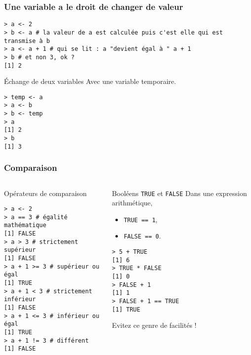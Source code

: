 \documentclass[10pt]{beamer}
\begin{document}
\begin{frame}[fragile]
  \frametitle{Une variable a le droit de changer de valeur}

  \begin{lstlisting}
> a <- 2
> b <- a # la valeur de a est calculée puis c'est elle qui est transmise à b
> a <- a + 1 # qui se lit : a "devient égal à " a + 1
> b # et non 3, ok ?
[1] 2
\end{lstlisting}


\begin{exampleblock}{Échange de deux variables}
  Avec une variable temporaire.
  \begin{lstlisting}[style=block]
> temp <- a
> a <- b
> b <- temp
> a
[1] 2
> b
[1] 3
  \end{lstlisting}
\end{exampleblock}
\end{frame}

\begin{frame}[fragile]
  \frametitle{Comparaison}
 
\begin{columns}[t]
\begin{column}{0.59\textwidth}
  \begin{block}{Opérateurs de comparaison}
  \begin{lstlisting}[style=block]
> a <- 2 
> a == 3 # égalité mathématique
[1] FALSE
> a > 3 # strictement supérieur 
[1] FALSE
> a + 1 >= 3 # supérieur ou égal
[1] TRUE
> a + 1 < 3 # strictement inférieur
[1] FALSE
> a + 1 <= 3 # inférieur ou égal
[1] TRUE
> a + 1 != 3 # différent
[1] FALSE
  \end{lstlisting}
\end{block}
\end{column}
\begin{column}{0.39\textwidth}
  \begin{block}{Booléens \texttt{TRUE} et \texttt{FALSE}}
    Dans une expression arithmétique,
    \begin{itemize}
    \item \texttt{TRUE == 1},
    \item \texttt{FALSE == 0}.
    \end{itemize}
  \begin{lstlisting}
> 5 + TRUE
[1] 6
> TRUE * FALSE
[1] 0
> FALSE + 1
[1] 1
> FALSE + 1 == TRUE
[1] TRUE
\end{lstlisting}
\alert{Evitez ce genre de facilités !}    
  \end{block}
\end{column}
\end{columns}
\end{frame}
\end{document}
